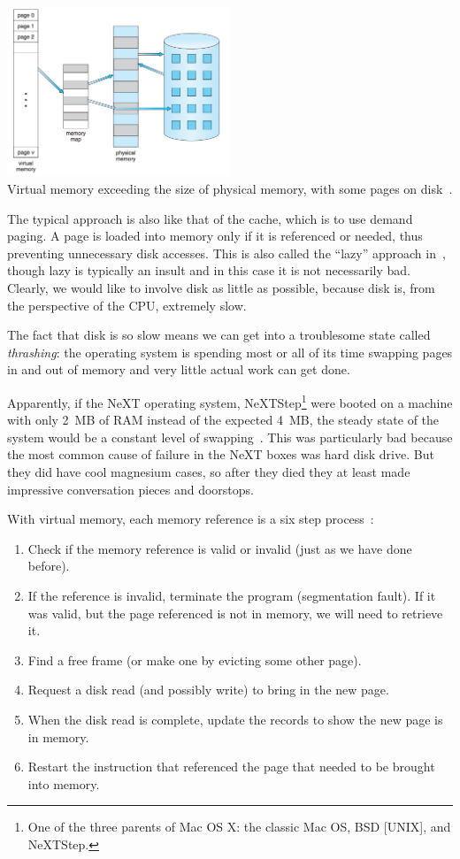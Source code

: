 \begin{center}
\includegraphics[width=0.5\textwidth]{images/vmem-physmem.png}\\
Virtual memory exceeding the size of physical memory, with some pages on disk~\cite{osc}.
\end{center}

The typical approach is also like that of the cache, which is to use demand paging. A page is loaded into memory only if it is referenced or needed, thus preventing unnecessary disk accesses. This is also called the ``lazy'' approach in~\cite{osc}, though lazy is typically an insult and in this case it is not necessarily bad.  Clearly, we would like to involve disk as little as possible, because disk is, from the perspective of the CPU, extremely slow.

The fact that disk is so slow means we can get into a troublesome state called \textit{thrashing}: the operating system is spending most or all of its time swapping pages in and out of memory and very little actual work can get done.

Apparently, if the NeXT operating system, NeXTStep\footnote{One of the three parents of Mac OS X: the classic Mac OS, BSD [UNIX], and NeXTStep.} were booted on a machine with only 2~MB of RAM instead of the expected 4~MB, the steady state of the system would be a constant level of swapping~\cite{mte241}. This was particularly bad because the most common cause of failure in the NeXT boxes was hard disk drive. But they did have cool magnesium cases, so after they died they at least made impressive conversation pieces and doorstops.

With virtual memory, each memory reference is a six step process~\cite{osc}:

\begin{enumerate}
	\item Check if the memory reference is valid or invalid (just as we have done before).
	\item If the reference is invalid, terminate the program (segmentation fault). If it was valid, but the page referenced is not in memory, we will need to retrieve it.
	\item Find a free frame (or make one by evicting some other page).
	\item Request a disk read (and possibly write) to bring in the new page.
	\item When the disk read is complete, update the records to show the new page is in memory.
	\item Restart the instruction that referenced the page that needed to be brought into memory.
\end{enumerate}

